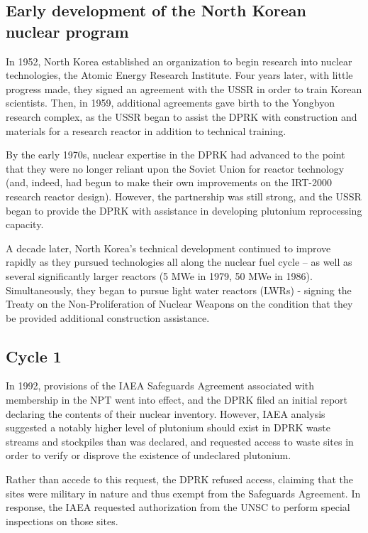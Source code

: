 \documentclass{article}
\begin{document}
\subsection{Early development of the North Korean nuclear program}
In 1952, North Korea established an organization to begin research into nuclear technologies, the Atomic Energy Research Institute\cite{ntiAERI}. Four years later, with little progress made, they signed an agreement with the USSR in order to train Korean scientists\cite{nti15}. Then, in 1959, additional agreements gave birth to the Yongbyon research complex, as the USSR began to assist the DPRK with construction and materials for a research reactor in addition to technical training\cite{nti15}.

By the early 1970s, nuclear expertise in the DPRK had advanced to the point that they were no longer reliant upon the Soviet Union for reactor technology (and, indeed, had begun to make their own improvements on the IRT-2000 research reactor design)\cite{nti15}. However, the partnership was still strong, and the USSR began to provide the DPRK with assistance in developing plutonium reprocessing capacity\cite{nti15}.

A decade later, North Korea’s technical development continued to improve rapidly as they pursued technologies all along the nuclear fuel cycle – as well as several significantly larger reactors (5 MWe in 1979\cite{ntiYongbyon}, 50 MWe in 1986\cite{ntiYongbyon2}). Simultaneously, they began to pursue light water reactors (LWRs) - signing the Treaty on the Non-Proliferation of Nuclear Weapons on the condition that they be provided additional construction assistance\cite{nti15}.   

\subsection{Cycle 1}

In 1992, provisions of the IAEA Safeguards Agreement associated with membership in the NPT went into effect, and the DPRK filed an initial report declaring the contents of their nuclear inventory\cite{iaea92}. However, IAEA analysis suggested a notably higher level of plutonium should exist in DPRK waste streams and stockpiles than was declared, and requested access to waste sites in order to verify or disprove the existence of undeclared plutonium\cite{iaea09}. 

Rather than accede to this request, the DPRK refused access, claiming that the sites were military in nature and thus exempt from the Safeguards Agreement\cite{nti15,iaea09}. In response, the IAEA requested authorization from the UNSC to perform special inspections on those sites\cite{nti15}.
 
\end{document}
